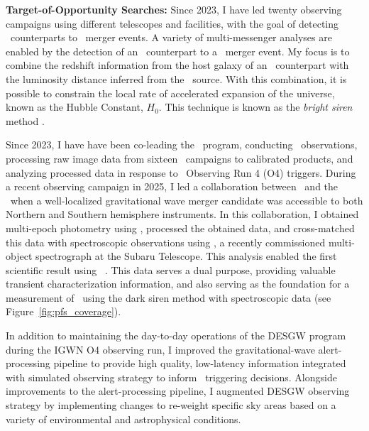 \textbf{Target-of-Opportunity Searches:}
Since 2023, I have led twenty observing campaigns using different telescopes and facilities, with the goal of detecting \EM\ counterparts to \GW\ merger events. 
A variety of multi-messenger analyses are enabled by the detection of an \EM\ counterpart to a \GW\ merger event. My focus is to combine the redshift information from the host galaxy of an \EM\ counterpart with the luminosity distance inferred from the \GW\ source. With this combination, it is possible to constrain the local rate of accelerated expansion of the universe, known as the Hubble Constant, $H_0$. This technique is known as the \textit{bright siren} method \cite{2017Natur.551...85A}.

Since 2023, I have have been co-leading the \DESGW\ program, conducting \DECam\ observations, processing raw image data from sixteen \ToO\ campaigns to calibrated products, and analyzing processed data in response to \LVK\ Observing Run 4 (O4) triggers.
During a recent observing campaign in 2025, I led a collaboration between \DESGW\ and the \JGEM\ when a well-localized gravitational wave merger candidate was accessible to both Northern and Southern hemisphere instruments. In this collaboration, I obtained multi-epoch photometry using \DECam, processed the obtained data, and cross-matched this data with spectroscopic observations using \PFS, a recently commissioned multi-object spectrograph at the Subaru Telescope. 
This analysis enabled the first scientific result using \PFS\ \citep{Zhang2025S250328ae}.
This data serves a dual 
purpose, providing valuable transient characterization information, and also serving as the foundation for a measurement of \Ho\ using the dark siren method with spectroscopic data (see Figure~\ref{fig:pfs_coverage}).

In addition to maintaining the day-to-day operations of the DESGW program during the IGWN O4 observing run, I improved the gravitational-wave alert-processing pipeline to provide high quality, low-latency information integrated with simulated observing strategy to inform \ToO\ triggering decisions. Alongside improvements to the alert-processing pipeline, I augmented DESGW observing strategy by implementing changes to re-weight specific sky areas based on a variety of environmental and astrophysical conditions. %



